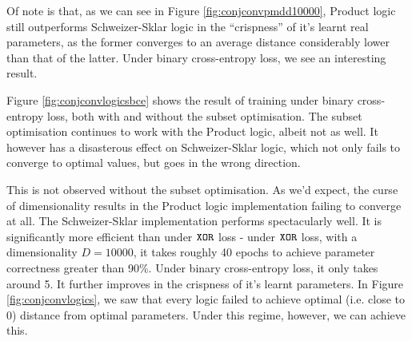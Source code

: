 Of note is that, as we can see in Figure \ref{fig:conjconvpmdd10000}, Product logic still outperforms Schweizer-Sklar logic in the ``crispness'' of it's learnt real parameters, as the former converges to an average distance considerably lower than that of the latter. Under binary cross-entropy loss, we see an interesting result. 

Figure \ref{fig:conjconvlogicsbce} shows the result of training under binary cross-entropy loss, both with and without the subset optimisation. The subset optimisation continues to work with the Product logic, albeit not as well. It however has a disasterous effect on Schweizer-Sklar logic, which not only fails to converge to optimal values, but goes in the wrong direction.

This is not observed without the subset optimisation. As we'd expect, the curse of dimensionality results in the Product logic implementation failing to converge at all. The Schweizer-Sklar implementation performs spectacularly well. It is significantly more efficient than under $\texttt{XOR}$ loss - under $\texttt{XOR}$ loss, with a dimensionality $D=10000$, it takes roughly 40 epochs to achieve parameter correctness greater than 90\%. Under binary cross-entropy loss, it only takes around 5. It further improves in the crispness of it's learnt parameters. In Figure \ref{fig:conjconvlogics}, we saw that every logic failed to achieve optimal (i.e. close to 0) distance from optimal parameters. Under this regime, however, we can achieve this. 

